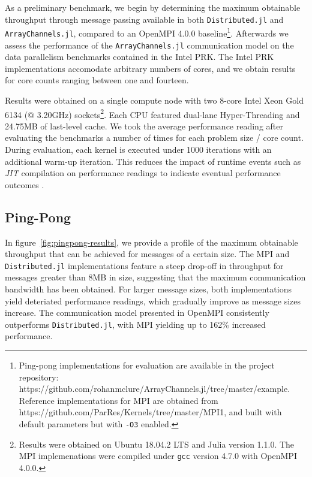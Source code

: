 \label{sec:results}

As a preliminary benchmark, we begin by determining the maximum
obtainable throughput through message passing available in both
\texttt{Distributed.jl} and \texttt{ArrayChannels.jl}, compared to an
OpenMPI 4.0.0 baseline\footnote{Ping-pong implementations for evaluation
  are available in the project repository:
  https://github.com/rohanmclure/ArrayChannels.jl/tree/master/example.
  Reference implementations for MPI are obtained from
  https://github.com/ParRes/Kernels/tree/master/MPI1, and built with
  default parameters but with \texttt{-O3} enabled.}. Afterwards we
assess the performance of the \texttt{ArrayChannels.jl} communication
model on the data parallelism benchmarks contained in the Intel PRK. The
Intel PRK implementations accomodate arbitrary numbers of cores, and we
obtain results for core counts ranging between one and fourteen.

Results were obtained on a single compute node with two 8-core Intel
Xeon Gold 6134 (@ 3.20GHz) sockets\footnote{Results were obtained on
  Ubuntu 18.04.2 LTS and Julia version 1.1.0. The MPI implemenations
  were compiled under \texttt{gcc} version 4.7.0 with OpenMPI 4.0.0.}.
Each CPU featured dual-lane Hyper-Threading and 24.75MB of last-level
cache. We took the average performance reading after evaluating the
benchmarks a number of times for each problem size / core count. During
evaluation, each kernel is executed under 1000 iterations with an
additional warm-up iteration. This reduces the impact of runtime events
such as \emph{JIT} compilation on performance readings to indicate
eventual performance outcomes \cite{blackburn, kulkarni}.

\subsection{Ping-Pong}
\label{sec:pingpong-results}

In figure~\ref{fig:pingpong-results}, we provide a profile of the
maximum obtainable throughput that can be achieved for messages of a
certain size. The MPI and \texttt{Distributed.jl} implementations
feature a steep drop-off in throughput for messages greater than 8MB in
size, suggesting that the maximum communication bandwidth has been
obtained. For larger message sizes, both implementations yield
deteriated performance readings, which gradually improve as message
sizes increase. The communication model presented in OpenMPI
consistently outperforms \texttt{Distributed.jl}, with MPI yielding up
to 162\% increased performance.


